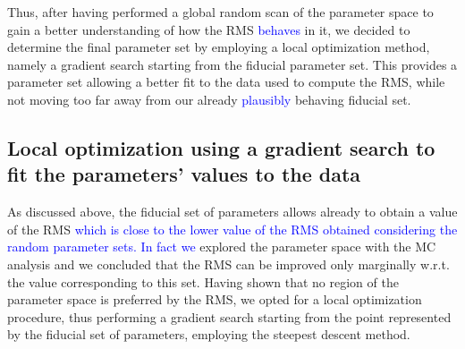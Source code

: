 \documentclass[oneside, 10pt, a4paper, twocolumn]{article}
\begin{document}
Thus, after having performed a global random scan of the parameter space to gain a better understanding of how the RMS \textcolor{blue}{behaves} in it, we decided to determine the final parameter set by employing a local optimization method, namely a gradient search starting from the fiducial parameter set. 
This provides a parameter set allowing a better fit to the data used to compute the RMS, while not moving too far away from our already \textcolor{blue}{plausibly} behaving fiducial set. 






\subsection{Local optimization using a gradient search to fit the parameters' values to the data}

As discussed above, the fiducial set of parameters allows already to obtain a value of the RMS \textcolor{blue}{which is close to the lower value of the RMS obtained considering the random parameter sets. In fact we} explored the parameter space with the MC analysis and we concluded that the RMS can be improved only marginally w.r.t. the value corresponding to this set. %
Having shown that no region of the parameter space is preferred by the RMS, we opted for a local optimization procedure, thus performing a gradient search starting from the point represented by the fiducial set of parameters, 
employing the steepest descent method. 
\end{document}
